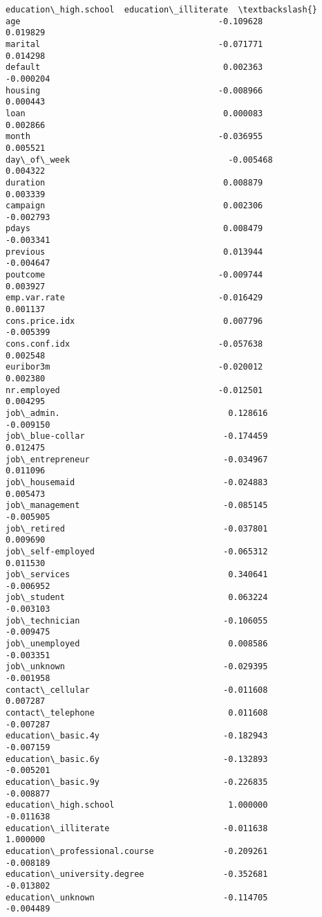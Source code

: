 \documentclass[11pt]{article}
\begin{document}
\begin{tcolorbox}[breakable, size=fbox, boxrule=.5pt, pad at break*=1mm, opacityfill=0]
\begin{Verbatim}[commandchars=\\\{\}]
                               education\_high.school  education\_illiterate  \textbackslash{}
age                                        -0.109628              0.019829
marital                                    -0.071771              0.014298
default                                     0.002363             -0.000204
housing                                    -0.008966              0.000443
loan                                        0.000083              0.002866
month                                      -0.036955              0.005521
day\_of\_week                                -0.005468              0.004322
duration                                    0.008879              0.003339
campaign                                    0.002306             -0.002793
pdays                                       0.008479             -0.003341
previous                                    0.013944             -0.004647
poutcome                                   -0.009744              0.003927
emp.var.rate                               -0.016429              0.001137
cons.price.idx                              0.007796             -0.005399
cons.conf.idx                              -0.057638              0.002548
euribor3m                                  -0.020012              0.002380
nr.employed                                -0.012501              0.004295
job\_admin.                                  0.128616             -0.009150
job\_blue-collar                            -0.174459              0.012475
job\_entrepreneur                           -0.034967              0.011096
job\_housemaid                              -0.024883              0.005473
job\_management                             -0.085145             -0.005905
job\_retired                                -0.037801              0.009690
job\_self-employed                          -0.065312              0.011530
job\_services                                0.340641             -0.006952
job\_student                                 0.063224             -0.003103
job\_technician                             -0.106055             -0.009475
job\_unemployed                              0.008586             -0.003351
job\_unknown                                -0.029395             -0.001958
contact\_cellular                           -0.011608              0.007287
contact\_telephone                           0.011608             -0.007287
education\_basic.4y                         -0.182943             -0.007159
education\_basic.6y                         -0.132893             -0.005201
education\_basic.9y                         -0.226835             -0.008877
education\_high.school                       1.000000             -0.011638
education\_illiterate                       -0.011638              1.000000
education\_professional.course              -0.209261             -0.008189
education\_university.degree                -0.352681             -0.013802
education\_unknown                          -0.114705             -0.004489


\end{Verbatim}
\end{tcolorbox}
\end{document}
